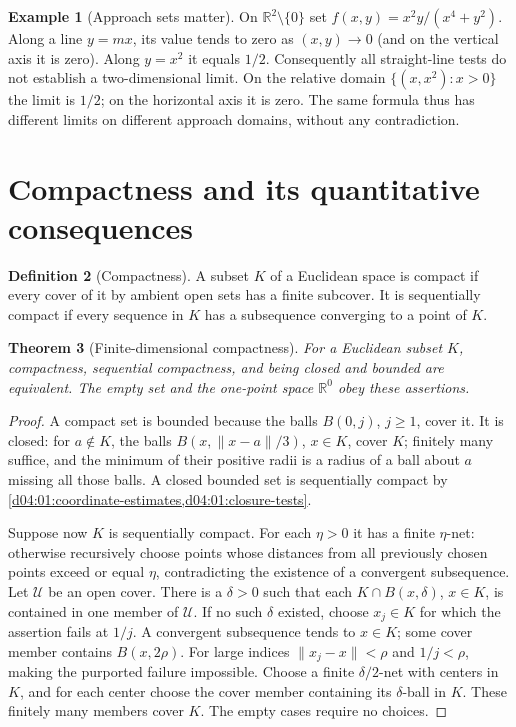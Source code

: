 \documentclass[11pt,oneside,openany]{book}
\newtheorem{theorem}{Theorem}[chapter]
\theoremstyle{definition}
\newtheorem{definition}[theorem]{Definition}
\newtheorem{example}[theorem]{Example}
\theoremstyle{remark}
\newcommand{\R}{\mathbb R}
\newcommand{\norm}[1]{\lVert#1\rVert}
\newcommand{\family}[1]{}
\begin{document}
\begin{example}[Approach sets matter]\label{d04:01:path-tests}
On $\R^2\setminus\{0\}$ set
$f(x,y)=x^2y/(x^4+y^2)$. Along a line $y=mx$, its value tends to zero
as $(x,y)\to0$ (and on the vertical axis it is zero). Along $y=x^2$
it equals $1/2$. Consequently all straight-line tests do not establish a
two-dimensional limit. On the relative domain $\{(x,x^2):x>0\}$ the limit
is $1/2$; on the horizontal axis it is zero. The same formula thus has
different limits on different approach domains, without any contradiction.
\end{example}

\section{Compactness and its quantitative consequences}
\family{K04.01.06}\family{K04.01.07}

\begin{definition}[Compactness]\label{d04:01:compact-definition}
A subset $K$ of a Euclidean space is compact if every cover of it by ambient
open sets has a finite subcover. It is sequentially compact if every sequence
in $K$ has a subsequence converging to a point of $K$.
\end{definition}

\begin{theorem}[Finite-dimensional compactness]\label{d04:01:compactness}
For a Euclidean subset $K$, compactness, sequential compactness, and being
closed and bounded are equivalent. The empty set and the one-point space
$\R^0$ obey these assertions.
\end{theorem}
\begin{proof}
A compact set is bounded because the balls $B(0,j)$, $j\geq1$, cover it.
It is closed: for $a\notin K$, the balls
$B(x,\norm{x-a}/3)$, $x\in K$, cover $K$; finitely many suffice, and
the minimum of their positive radii is a radius of a ball about $a$ missing
all those balls. A closed bounded set is sequentially compact by
\cref{d04:01:coordinate-estimates,d04:01:closure-tests}.

Suppose now $K$ is sequentially compact. For each $\eta>0$ it has a finite
$\eta$-net: otherwise recursively choose points whose distances from all
previously chosen points exceed or equal $\eta$, contradicting the existence
of a convergent subsequence. Let $\mathcal U$ be an open cover. There is a
$\delta>0$ such that each $K\cap B(x,\delta)$, $x\in K$, is contained
in one member of $\mathcal U$. If no such $\delta$ existed, choose $x_j\in K$
for which the assertion fails at $1/j$. A convergent subsequence tends to
$x\in K$; some cover member contains $B(x,2\rho)$. For large indices
$\norm{x_j-x}<\rho$ and $1/j<\rho$, making the purported failure
impossible. Choose a finite $\delta/2$-net with centers in $K$, and for each
center choose the cover member containing its $\delta$-ball in $K$. These
finitely many members cover $K$. The empty cases require no choices.
\end{proof}
\end{document}
